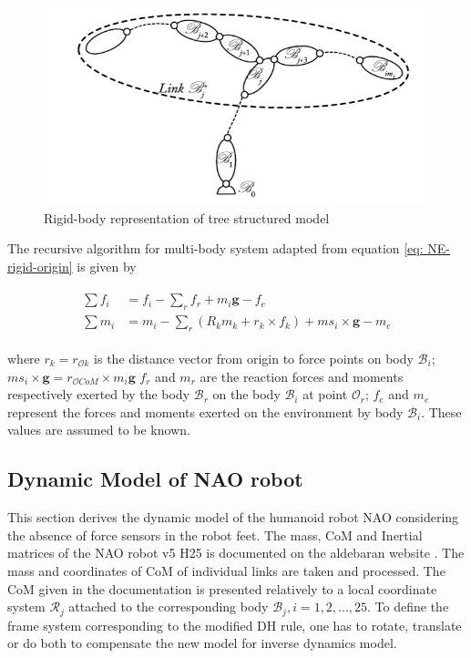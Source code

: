 \begin{figure}[h!]
    \centering
    \includegraphics[scale=0.5]{images/multi-rigid-body.png}\hfill
    \caption{Rigid-body representation of tree structured model}\hfill
    \label{fig: tree-rigid-body}
\end{figure}

The recursive algorithm for multi-body system adapted from equation \ref{eq: NE-rigid-origin} is given by \cite{khalilunified}

\begin{align}
    \begin{split}
        \sum f_i &= f_i - \sum_r f_r + m_i\mathbf{g} - f_e \\
        \sum m_i &= m_i - \sum_r (R_km_k + r_k \times f_k) + ms_i \times \mathbf{g} - m_e 
    \end{split}
\end{align}

where $r_k = r_{\mathcal{O}k}$ is the distance vector from origin to force points on body $\mathcal{B}_i$; $ms_i \times \mathbf{g} = r_{\mathcal{O}CoM} \times m_i\mathbf{g}$
$f_r$ and $m_r$ are the reaction forces and moments respectively exerted by the body $\mathcal{B}_r$ on the body $\mathcal{B}_i$ at point $\mathcal{O}_r$;
$f_e$ and $m_e$ represent the forces and moments exerted on the environment by body $\mathcal{B}_i$. These values are assumed to be known.

\subsection{Dynamic Model of NAO robot}

This section derives the dynamic model of the humanoid robot NAO considering the absence of force sensors in the robot feet. 
The mass, CoM and Inertial matrices of the NAO robot v5 H25 is documented on the aldebaran website \cite{aldebaran-masses}. The mass and coordinates of CoM of individual 
links are taken and processed. The CoM given in the documentation is presented relatively to a local coordinate system $\mathcal{R}_j$ attached to the corresponding body $\mathcal{B}_j, i={1, 2, ..., 25}$.
To define the frame system corresponding to the modified DH rule, one has to rotate, translate or do both to compensate the new model for 
inverse dynamics model.

